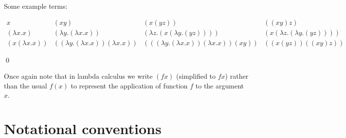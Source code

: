 \documentclass[11pt]{article}
\begin{document}
\begin{uexample}\label{fullex}
Some example terms:
\renewcommand{\arraycolsep}{6pt}
\renewcommand{\arraystretch}{2}

$$
\begin{array}{cccc}
x & (xy) & (x(yz))  & ((xy)z) \\
(\lambda x.x) & (\lambda y.(\lambda x.x)) & (\lambda z.(x(\lambda y.(yz)))) & (x(\lambda z.(\lambda y.(yz))))\\
(x(\lambda x.x)) & ((\lambda y.(\lambda x.x))(\lambda x.x)) & (((\lambda y.(\lambda x.x))(\lambda x.x))(xy)) & ((x(yz))((xy)z))
\end{array}
$$

\qed
\end{uexample}

Once again note that in lambda calculus we write $(f x)$ (simplified to $fx$) rather than the usual $f(x)$
to represent the application of function $f$ to the argument $x$.

\section{Notational conventions}
\label{scnotcon}
\end{document}
